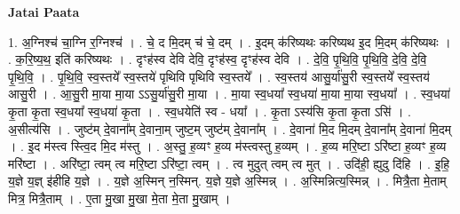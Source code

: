 \documentclass[17pt]{extarticle}
\begin{document}
\textbf{Jatai Paata} \newline

1. अ॒ग्निश्च॑ चा॒ग्नि र॒ग्निश्च॑ । . चे॒ द मि॒दम् च॑ चे॒ दम् । . इ॒दम् क॑रिष्यथः करिष्यथ इ॒द मि॒दम् क॑रिष्यथः । . क॒रि॒ष्य॒थ॒ इति॑ करिष्यथः । . दृꣳह॑स्व देवि देवि॒ दृꣳह॑स्व॒ दृꣳह॑स्व देवि । . दे॒वि॒ पृ॒थि॒वि॒ पृ॒थि॒वि॒ दे॒वि॒ दे॒वि॒ पृ॒थि॒वि॒ । . पृ॒थि॒वि॒ स्व॒स्तये᳚ स्व॒स्तये॑ पृथिवि पृथिवि स्व॒स्तये᳚ । . स्व॒स्तय॑ आसु॒र्या॑सु॒री स्व॒स्तये᳚ स्व॒स्तय॑ आसु॒री । . आ॒सु॒री मा॒या मा॒या ऽऽसु॒र्या॑सु॒री मा॒या । . मा॒या स्व॒धया᳚ स्व॒धया॑ मा॒या मा॒या स्व॒धया᳚ । . स्व॒धया॑ कृ॒ता कृ॒ता स्व॒धया᳚ स्व॒धया॑ कृ॒ता । . स्व॒धयेति॑ स्व - धया᳚ । . कृ॒ता ऽस्य॑सि कृ॒ता कृ॒ता ऽसि॑ । . अ॒सीत्य॑सि । . जुष्ट॑म् दे॒वाना᳚म् दे॒वाना॒म् जुष्ट॒म् जुष्ट॑म् दे॒वाना᳚म् । . दे॒वाना॑ मि॒द मि॒दम् दे॒वाना᳚म् दे॒वाना॑ मि॒दम् । . इ॒द म॑स्त्व स्त्वि॒द मि॒द म॑स्तु । . अ॒स्तु॒ ह॒व्यꣳ ह॒व्य म॑स्त्वस्तु ह॒व्यम् । . ह॒व्य मरि॒ष्टा ऽरि॑ष्टा ह॒व्यꣳ ह॒व्य मरि॑ष्टा । . अरि॑ष्टा॒ त्वम् त्व मरि॒ष्टा ऽरि॑ष्टा॒ त्वम् । . त्व मुदुत् त्वम् त्व मुत् । . उदि॑ही॒ ह्युदु दि॑हि । . इ॒हि॒ य॒ज्ञे य॒ज्ञ् इ॑हीहि य॒ज्ञे । . य॒ज्ञे अ॒स्मिन् न॒स्मिन्. य॒ज्ञे य॒ज्ञे अ॒स्मिन्न् । . अ॒स्मिन्नित्य॒स्मिन्न् । . मित्रै॒ता मे॒ताम् मित्र॒ मित्रै॒ताम् । . ए॒ता मु॒खा मु॒खा मे॒ता मे॒ता मु॒खाम् । \newline
\end{document}
